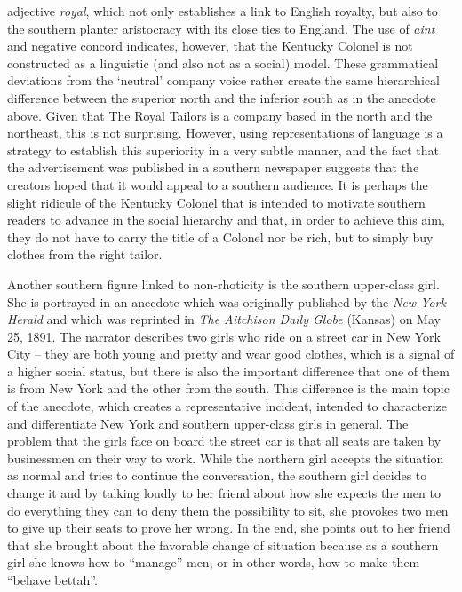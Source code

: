 adjective \emph{royal}, which not only establishes a link to English royalty, but also to the southern planter aristocracy with its close ties to England. The use of \emph{aint} and negative concord indicates, however, that the Kentucky Colonel is not constructed as a linguistic (and also not as a social) model. These grammatical deviations from the ‘neutral’ company voice rather create the same hierarchical difference between the superior north and the inferior south as in the anecdote above. Given that The Royal Tailors is a company based in the north and the northeast, this is not surprising. However, using representations of language is a strategy to establish this superiority in a very subtle manner, and the fact that the advertisement was published in a southern newspaper suggests that the creators hoped that it would appeal to a southern audience. It is perhaps the slight ridicule of the Kentucky Colonel that is intended to motivate southern readers to advance in the social hierarchy and that, in order to achieve this aim, they do not have to carry the title of a Colonel nor be rich, but to simply buy clothes from the right tailor.



Another southern figure linked to non-rhoticity is the southern upper-class girl. She is portrayed in an anecdote which was originally published by the \emph{New York Herald} and which was reprinted in \emph{The Aitchison Daily Globe} (Kansas) on May 25, 1891. The narrator describes two girls who ride on a street car in New York City – they are both young and pretty and wear good clothes, which is a signal of a higher social status, but there is also the important difference that one of them is from New York and the other from the south. This difference is the main topic of the anecdote, which creates a representative incident, intended to characterize and differentiate New York and southern upper-class girls in general. The problem that the girls face on board the street car is that all seats are taken by businessmen on their way to work. While the northern girl accepts the situation as normal and tries to continue the conversation, the southern girl decides to change it and by talking loudly to her friend about how she expects the men to do everything they can to deny them the possibility to sit, she provokes two men to give up their seats to prove her wrong. In the end, she points out to her friend that she brought about the favorable change of situation because as a southern girl she knows how to “manage” men, or in other words, how to make them “behave bettah”.


